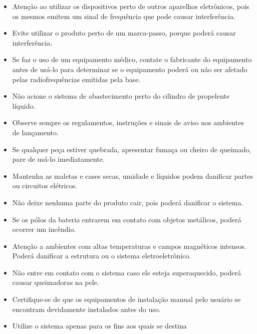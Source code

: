 \begin{itemize}

\item Atenção ao utilizar os dispositivos perto de outros aparelhos eletrônicos, pois os mesmos emitem um sinal de frequência que pode causar interferência.
\item Evite utilizar o produto perto de um marca-passo, porque poderá causar interferência. 
\item Se faz o uso de um equipamento médico, contate o fabricante do equipamento antes de usá-lo para determinar se o equipamento poderá ou não ser afetado pelas radiofrequências emitidas pela base.
\item Não acione o sistema de abastecimento perto do cilindro de propelente líquido.
\item Observe sempre os regulamentos, instruções e sinais de aviso nos ambientes de lançamento.
\item Se qualquer peça estiver quebrada, apresentar fumaça ou cheiro de queimado, pare de usá-lo imediatamente.
\item Mantenha as maletas e cases secas, umidade e líquidos podem danificar partes ou circuitos elétricos.
\item Não deixe nenhuma parte do produto cair, pois poderá danificar o sistema.
\item Se os pólos da bateria entrarem em contato com objetos metálicos, poderá ocorrer um incêndio.
\item Atenção a ambientes com altas temperaturas e campos magnéticos intensos. Poderá danificar a estrutura ou o sistema eletroeletrônico.
\item Não entre em contato com o sistema caso ele esteja superaquecido, poderá causar queimadoras na pele.
\item Certifique-se de que os equipamentos de instalação manual pelo usuário se encontram devidamente instalados antes do uso.
\item Utilize o sistema apenas para os fins aos quais se destina

\end{itemize}
